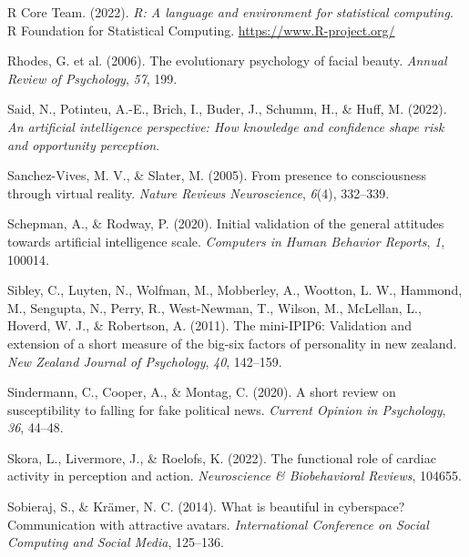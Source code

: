 \documentclass[
  man,floatsintext]{apa6}
\newlength{\cslhangindent}
\newlength{\cslentryspacingunit} %
\newenvironment{CSLReferences}[2] %
 {%
  \setlength{\parindent}{0pt}
  \ifodd #1
  \let\oldpar\par
  \def\par{\hangindent=\cslhangindent\oldpar}
  \fi
  \setlength{\parskip}{#2\cslentryspacingunit}
 }%
 {}
\begin{document}
\begin{CSLReferences}{1}{0}
\leavevmode{}%
R Core Team. (2022). \emph{R: A language and environment for statistical computing}. R Foundation for Statistical Computing. \url{https://www.R-project.org/}

\leavevmode{}%
Rhodes, G. et al. (2006). The evolutionary psychology of facial beauty. \emph{Annual Review of Psychology}, \emph{57}, 199.

\leavevmode{}%
Said, N., Potinteu, A.-E., Brich, I., Buder, J., Schumm, H., \& Huff, M. (2022). \emph{An artificial intelligence perspective: How knowledge and confidence shape risk and opportunity perception}.

\leavevmode{}%
Sanchez-Vives, M. V., \& Slater, M. (2005). From presence to consciousness through virtual reality. \emph{Nature Reviews Neuroscience}, \emph{6}(4), 332--339.

\leavevmode{}%
Schepman, A., \& Rodway, P. (2020). Initial validation of the general attitudes towards artificial intelligence scale. \emph{Computers in Human Behavior Reports}, \emph{1}, 100014.

\leavevmode{}%
Sibley, C., Luyten, N., Wolfman, M., Mobberley, A., Wootton, L. W., Hammond, M., Sengupta, N., Perry, R., West-Newman, T., Wilson, M., McLellan, L., Hoverd, W. J., \& Robertson, A. (2011). The mini-IPIP6: Validation and extension of a short measure of the big-six factors of personality in new zealand. \emph{New Zealand Journal of Psychology}, \emph{40}, 142--159.

\leavevmode{}%
Sindermann, C., Cooper, A., \& Montag, C. (2020). A short review on susceptibility to falling for fake political news. \emph{Current Opinion in Psychology}, \emph{36}, 44--48.

\leavevmode{}%
Skora, L., Livermore, J., \& Roelofs, K. (2022). The functional role of cardiac activity in perception and action. \emph{Neuroscience \& Biobehavioral Reviews}, 104655.

\leavevmode{}%
Sobieraj, S., \& Krämer, N. C. (2014). What is beautiful in cyberspace? Communication with attractive avatars. \emph{International Conference on Social Computing and Social Media}, 125--136.


\end{CSLReferences}
\end{document}
